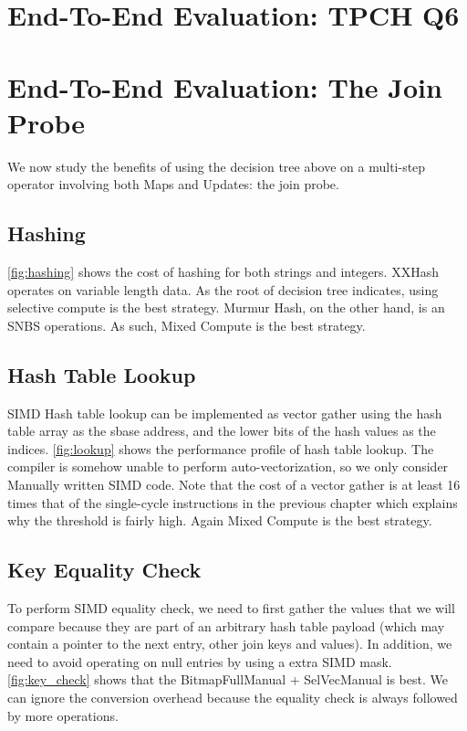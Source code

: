 \documentclass[12pt]{cmuthesis}
\begin{document}
\iffalse
\chapter{End-To-End Evaluation: TPCH Q6}


\chapter{End-To-End Evaluation: The Join Probe}
We now study the benefits of using the decision tree above on a multi-step operator involving both Maps and Updates: the join probe.

\section{Hashing}
\cref{fig:hashing} shows the cost of hashing for both strings and integers. XXHash operates on variable length data. As the root of decision tree indicates, using selective compute is the best strategy. Murmur Hash, on the other hand, is an SNBS operations. As such, Mixed Compute is the best strategy.

\section{Hash Table Lookup}
SIMD Hash table lookup can be implemented as vector gather using the hash table array as the sbase address, and the lower bits of the hash values as the indices. \cref{fig:lookup} shows the performance profile of hash table lookup. The compiler is somehow unable to perform auto-vectorization, so we only consider Manually written SIMD code. Note that the cost of a vector gather is at least 16 times that of the single-cycle instructions in the previous chapter which explains why the threshold is fairly high. Again Mixed Compute is the best strategy.

\section{Key Equality Check}
To perform SIMD equality check, we need to first gather the values that we will compare because they are part of an arbitrary hash table payload (which may contain a pointer to the next entry, other join keys and values). In addition, we need to avoid operating on null entries by using a extra SIMD mask. \cref{fig:key_check} shows that the BitmapFullManual + SelVecManual is best. We can ignore the conversion overhead because the equality check is always followed by more operations.
\end{document}
